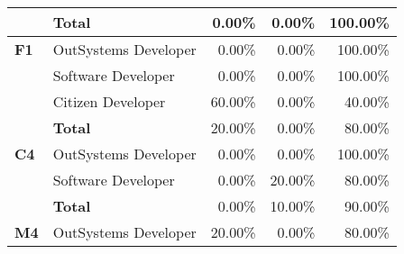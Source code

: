 \begin{table}[tb]
\begin{tabular}{llrrr}
                            & \textbf{Total}       & 0.00\%                                                            & 0.00\%                                                                  & 100.00\%                                                      \\ \hline
  \textbf{F1}               & OutSystems Developer & 0.00\%                                                            & 0.00\%                                                                  & 100.00\%                                                      \\
                            & Software Developer   & 0.00\%                                                            & 0.00\%                                                                  & 100.00\%                                                      \\
                            & Citizen Developer    & 60.00\%                                                           & 0.00\%                                                                  & 40.00\%                                                       \\
                            & \textbf{Total}       & 20.00\%                                                           & 0.00\%                                                                  & 80.00\%                                                       \\ \hline
  \textbf{C4}               & OutSystems Developer & 0.00\%                                                            & 0.00\%                                                                  & 100.00\%                                                      \\
                            & Software Developer   & 0.00\%                                                            & 20.00\%                                                                 & 80.00\%                                                       \\
                            & \textbf{Total}       & 0.00\%                                                            & 10.00\%                                                                 & 90.00\%                                                       \\ \hline
  \textbf{M4}               & OutSystems Developer & 20.00\%                                                           & 0.00\%                                                                  & 80.00\%                                                       \\

\end{tabular}
\end{table}
